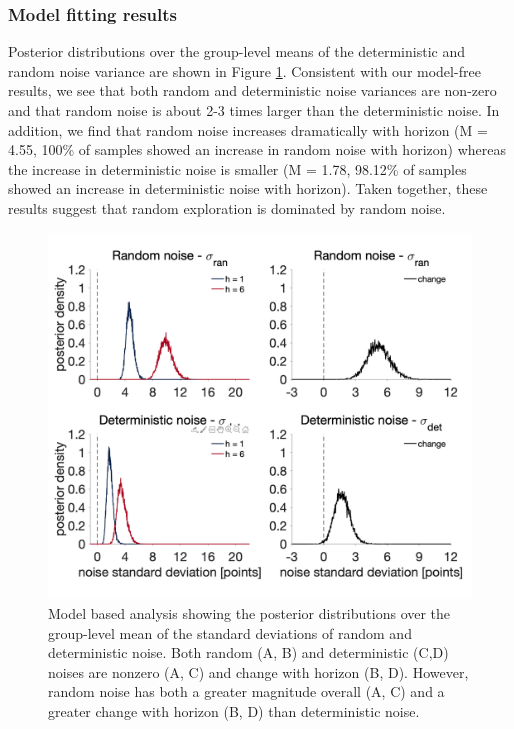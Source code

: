 \documentclass[12pt]{article}
\begin{document}
	\subsubsection*{Model fitting results} 
	
	Posterior distributions over the group-level means of the deterministic and random noise variance are shown in Figure \ref{fig:mb1}. Consistent with our model-free results, we see that both random and deterministic noise variances are non-zero and that random noise is about 2-3 times larger than the deterministic noise. In addition, we find that random noise increases dramatically with horizon (M = 4.55, 100\% of samples showed an increase in random noise with horizon) whereas the increase in deterministic noise is smaller (M = 1.78, 98.12\% of samples showed an increase in deterministic noise with horizon).  Taken together, these results suggest that random exploration is dominated by random noise.
	
	\begin{figure}[H]
		\begin{center}
			\includegraphics[width=1\textwidth]{figures/RanDetNoise_hyperprior.png}
			\caption{Model based analysis showing the posterior distributions over the group-level mean of the standard deviations of  random and deterministic noise. Both random (A, B) and deterministic (C,D) noises are nonzero (A, C) and change with horizon (B, D).  However, random noise has both a greater magnitude overall (A, C) and a greater change with horizon (B, D) than deterministic noise.}
			\label{fig:mb1}
		\end{center}
	\end{figure}
	
\end{document}
